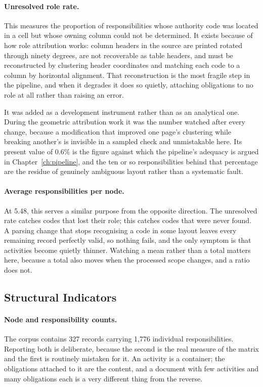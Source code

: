 \paragraph{Unresolved role rate.} This measures the proportion of responsibilities whose
authority code was located in a cell but whose owning column could not be determined. It
exists because of how role attribution works: column headers in the source are printed
rotated through ninety degrees, are not recoverable as table headers, and must be
reconstructed by clustering header coordinates and matching each code to a column by
horizontal alignment. That reconstruction is the most fragile step in the pipeline, and when
it degrades it does so quietly, attaching obligations to no role at all rather than raising
an error.

It was added as a development instrument rather than as an analytical one. During the
geometric attribution work it was the number watched after every change, because a
modification that improved one page's clustering while breaking another's is invisible in a
sampled check and unmistakable here. Its present value of 0.6\% is the figure against which
the pipeline's adequacy is argued in Chapter~\ref{ch:pipeline}, and the ten or so
responsibilities behind that percentage are the residue of genuinely ambiguous layout rather
than a systematic fault.

\paragraph{Average responsibilities per node.} At 5.48, this serves a similar purpose from
the opposite direction. The unresolved rate catches codes that lost their role; this catches
codes that were never found. A parsing change that stops recognising a code in some layout
leaves every remaining record perfectly valid, so nothing fails, and the only symptom is that
activities become quietly thinner. Watching a mean rather than a total matters here, because
a total also moves when the processed scope changes, and a ratio does not.

\subsection{Structural Indicators}

\paragraph{Node and responsibility counts.} The corpus contains 327 records carrying 1,776
individual responsibilities. Reporting both is deliberate, because the second is the real
measure of the matrix and the first is routinely mistaken for it. An activity is a container;
the obligations attached to it are the content, and a document with few activities and many
obligations each is a very different thing from the reverse.

